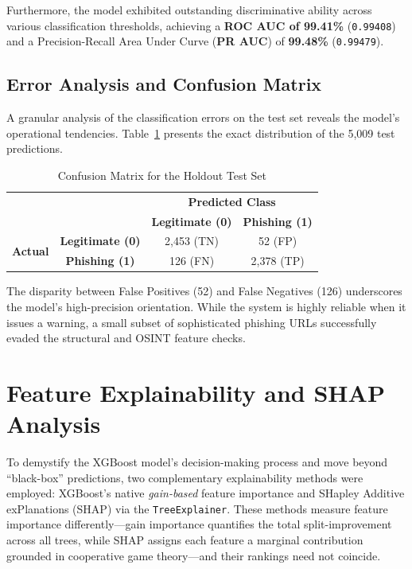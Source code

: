 Furthermore, the model exhibited outstanding discriminative ability
across various classification thresholds, achieving a \textbf{ROC AUC of
99.41\%} (\texttt{0.99408}) and a Precision-Recall Area Under Curve
(\textbf{PR AUC}) of \textbf{99.48\%} (\texttt{0.99479}).

\subsection{Error Analysis and Confusion
Matrix}\label{error-analysis-and-confusion-matrix}

A granular analysis of the classification errors on the test set reveals
the model's operational tendencies. Table~\ref{tab:confusion_matrix} presents the exact distribution of the 5,009 test predictions.

\begin{table}[htbp]
\centering
\caption{Confusion Matrix for the Holdout Test Set}
\label{tab:confusion_matrix}
\renewcommand{\arraystretch}{1.5}
\begin{tabular}{cc|cc}
\multicolumn{2}{c}{} & \multicolumn{2}{c}{\textbf{Predicted Class}} \\
\multicolumn{2}{c|}{} & \textbf{Legitimate (0)} & \textbf{Phishing (1)} \\
\hline
\multirow{2}{*}{\textbf{Actual}} & \textbf{Legitimate (0)} & 2,453 (TN) & 52 (FP) \\
& \textbf{Phishing (1)} & 126 (FN) & 2,378 (TP) \\
\end{tabular}
\end{table}

The disparity between False Positives (52) and False Negatives (126)
underscores the model's high-precision orientation. While the system is
highly reliable when it issues a warning, a small subset of
sophisticated phishing URLs successfully evaded the structural and OSINT
feature checks.

\section{Feature Explainability and SHAP
Analysis}\label{feature-explainability-and-shap-analysis}

To demystify the XGBoost model's decision-making process and move beyond
``black-box'' predictions, two complementary explainability methods were
employed: XGBoost's native \emph{gain-based} feature importance and
SHapley Additive exPlanations (SHAP) via the \texttt{TreeExplainer}.
These methods measure feature importance differently---gain importance
quantifies the total split-improvement across all trees, while SHAP
assigns each feature a marginal contribution grounded in cooperative
game theory---and their rankings need not coincide.

